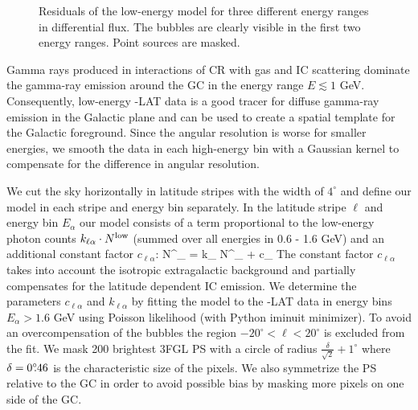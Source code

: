 \begin{figure}[t]
{\begin{subfigure}{0.3\textwidth}
    	\end{subfigure}
    }
  	\caption{Residuals of the low-energy model for three different energy ranges in differential flux. The \Fermi bubbles are clearly visible in the first two energy ranges. Point sources are masked. }
  	\label{fig:Maps_lowE}
\end{figure}

Gamma rays produced in interactions of CR with gas and IC scattering dominate the gamma-ray emission around the GC in the energy range $E \lesssim 1$ GeV. 
Consequently, low-energy \Fermi-LAT data is a good tracer for diffuse gamma-ray emission in the Galactic plane and can be used to create a spatial template for the Galactic foreground.
Since the angular resolution is worse for smaller energies, we smooth the data in each high-energy bin with a Gaussian kernel to compensate for the difference in angular resolution. 

We cut the sky horizontally in latitude stripes with the width of $4^\circ$ and define our model in each stripe and energy bin separately. 
In the latitude stripe $\ell$ and energy bin $E_\alpha$ our model consists of a term proportional to the low-energy photon counts $k_{\ell\alpha} \cdot N^{\text{low}}$ (summed over all energies in 0.6 - 1.6 GeV) and an additional constant factor $c_{\ell\alpha}$: 
\be
N^\model_{\ell \alpha} = k_{\ell \alpha} \cdot N^\low_{\ell \alpha} + c_{\ell \alpha}
\ee
{}
The constant factor $c_{\ell \alpha}$ takes into account the isotropic extragalactic background and partially compensates for the latitude dependent IC emission. 
We determine the parameters $c_{\ell \alpha}$ and $k_{\ell \alpha}$ by fitting the model to the \Fermi-LAT data in energy bins $E_\alpha > 1.6$ GeV
using Poisson likelihood (with Python iminuit minimizer).
To avoid an overcompensation of the \Fermi bubbles the region $-20^\circ < \ell < 20^\circ$ is excluded from the fit. 
We mask 200 brightest 3FGL PS  with a circle of radius $\frac{\delta}{\sqrt{2}} + 1^\circ$ where $\delta = 0^\circ\!\!.46$ is the characteristic size of the pixels. 
We also symmetrize the PS relative to the GC in order to avoid possible bias by masking more pixels on one side of the GC.

